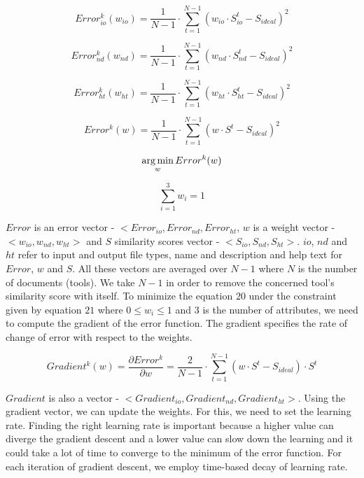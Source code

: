 \begin{equation}
Error^k_{io}(w_{io}) = \frac{1}{N - 1} \cdot \sum_{t=1}^{N-1} (w_{io} \cdot S^t_{io} - S_{ideal}) ^ 2
\end{equation}

\begin{equation}
Error^k_{nd}(w_{nd}) = \frac{1}{N - 1} \cdot \sum_{t=1}^{N-1} (w_{nd} \cdot S^t_{nd} - S_{ideal}) ^ 2
\end{equation}

\begin{equation}
Error^k_{ht}(w_{ht}) =  \frac{1}{N - 1} \cdot \sum_{t=1}^{N-1} (w_{ht} \cdot S^t_{ht} - S_{ideal}) ^ 2
\end{equation}

\begin{equation}
Error^k(w) =  \frac{1}{N - 1} \cdot \sum_{t=1}^{N-1} (w \cdot S^t - S_{ideal}) ^ 2
\end{equation}

\begin{equation}
\operatorname*{arg\,min}_w Error^k(w) 
\end{equation}

\begin{equation}
\sum_{i=1}^{3} w_i = 1
\end{equation}

$Error$ is an error vector - $<Error_{io}, Error_{nd}, Error_{ht}$, $w$ is a weight vector - $<w_{io}, w_{nd}, w_{ht}>$ and $S$ similarity scores vector - $<S_{io}, S_{nd}, S_{ht}>$. $io$, $nd$ and $ht$ refer to input and output file types, name and description and help text for $Error$, $w$ and $S$. All these vectors are averaged over $N-1$ where $N$ is the number of documents (tools). We take $N-1$ in order to remove the concerned tool's similarity score with itself. To minimize the equation $20$ under the constraint given by equation $21$ where $0 \leq w_i \leq 1$ and $3$ is the number of attributes, we need to compute the gradient of the error function. The gradient specifies the rate of change of error with respect to the weights.

\begin{equation}
Gradient^k(w) = \frac{\partial Error^k}{\partial w} =  \frac{2}{N - 1} \cdot \sum_{t=1}^{N-1} (w \cdot S^t - S_{ideal}) \cdot S^t
\end{equation}

$Gradient$ is also a vector - $<Gradient_{io}, Gradient_{nd}, Gradient_{ht}>$. Using the gradient vector, we can update the weights. For this, we need to set the learning rate. Finding the right learning rate is important because a higher value can diverge the gradient descent and a lower value can slow down the learning and it could take a lot of time to converge to the minimum of the error function. For each iteration of gradient descent, we employ time-based decay of learning rate.

